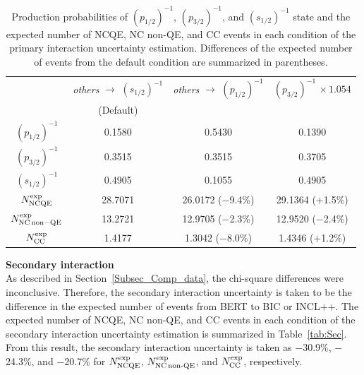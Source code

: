 \begin{table}[h]
	\centering
	\caption[Production probabilities of $(p_{1/2})^{-1}$, $(p_{3/2})^{-1}$, and $(s_{1/2})^{-1}$ state and the expected number of NCQE, NC non-QE, and CC events in each condition of the primary interaction uncertainty estimation]{
	Production probabilities of $(p_{1/2})^{-1}$, $(p_{3/2})^{-1}$, and $(s_{1/2})^{-1}$ state and the expected number of NCQE, NC non-QE, and CC events in each condition of the primary interaction uncertainty estimation.
	Differences of the expected number of events from the default condition are summarized in parentheses.
	}\label{tab:Pri}
	\vs
	\begin{tabular}{cccc} \hline \hline
		                               & \textit{others} $\to$ $(s_{1/2})^{-1}$ & \textit{others} $\to$ $(p_{1/2})^{-1}$ & $(p_{3/2})^{-1}$ $\times\,1.054$  \\
		                               & (Default)                              &                                        &                                   \\ \hline
		$(p_{1/2})^{-1}$               & 0.1580                                 & 0.5430                                 & 0.1390                            \\
		$(p_{3/2})^{-1}$               & 0.3515                                 & 0.3515                                 & 0.3705                            \\
		$(s_{1/2})^{-1}$               & 0.4905                                 & 0.1055                                 & 0.4905                            \\ \hline
		$N^{\rm exp}_{\rm NCQE}$       & 28.7071                                & 26.0172 ($-$9.4\%)                     & 29.1364 ($+$1.5\%)                \\
		$N^{\rm exp}_{\rm NC\,non-QE}$ & 13.2721                                & 12.9705 ($-$2.3\%)                     & 12.9520 ($-$2.4\%)                \\
		$N^{\rm exp}_{\rm CC}$         & 1.4177                                 & 1.3042 ($-$8.0\%)                      & 1.4346 ($+$1.2\%)                 \\ \hline \hline
	\end{tabular}
\end{table}

\textbf{Secondary interaction}\\
\hs
As described in Section~\ref{Subsec_Comp_data}, the chi-square differences were inconclusive.
Therefore, the secondary interaction uncertainty is taken to be the difference in the expected number of events from BERT to BIC or INCL++.
The expected number of NCQE, NC non-QE, and CC events in each condition of the secondary interaction uncertainty estimation is summarized in Table~\ref{tab:Sec}.
From this result, the secondary interaction uncertainty is taken as $-$30.9\%, $-$24.3\%, and $-$20.7\% for $N^{\rm exp}_{\rm NCQE}$, $N^{\rm exp}_{\rm NC\,non\mathchar`-QE}$, and $N^{\rm exp}_{\rm CC}$, respectively.\\

